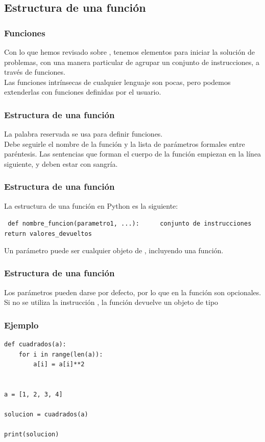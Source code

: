 \subsection{Estructura de una función}
\begin{frame}
\frametitle{Funciones}
Con lo que hemos revisado sobre \python, tenemos elementos para iniciar la solución de problemas, con una manera particular de agrupar un conjunto de instrucciones, a través de funciones.
\\
\bigskip
Las funciones intrínsecas de cualquier lenguaje son pocas, pero podemos extenderlas con funciones definidas por el usuario.
\end{frame}
\begin{frame}[fragile]
\frametitle{Estructura de una función}
La palabra reservada  se usa para definir funciones. 
\\
\bigskip
Debe seguirle el nombre de la función y la lista de parámetros formales entre paréntesis. Las sentencias que forman el cuerpo de la función empiezan en la línea siguiente, y deben estar con sangría.
\end{frame}
\begin{frame}[fragile]
\frametitle{Estructura de una función}
La estructura de una función en Python es la siguiente:
\begin{center}
\fontsize{12}{12}\selectfont
\begin{exampleblock}{}
\verb| def nombre_funcion(parametro1, ...):|
\verb|     conjunto de instrucciones|
\verb|     return valores_devueltos|
\end{exampleblock}
\end{center}
Un parámetro puede ser cualquier objeto de \python, incluyendo una función.
\end{frame}
\begin{frame}
\frametitle{Estructura de una función}
Los parámetros pueden darse por defecto, por lo que en la función son opcionales. 
\\
\bigskip
Si no se utiliza la instrucción , la función devuelve un objeto de tipo 
\end{frame}
\begin{frame}[fragile]
\frametitle{Ejemplo}
\begin{lstlisting}[caption=Función sencilla,basicstyle=\linespread{1.2}\ttfamily\small, columns=fullflexible,escapeinside=||]
def cuadrados(a):
	for i in range(len(a)):
		a[i] = a[i]**2


a = [1, 2, 3, 4]

solucion = cuadrados(a)

print(solucion)
\end{lstlisting}
\end{frame}
